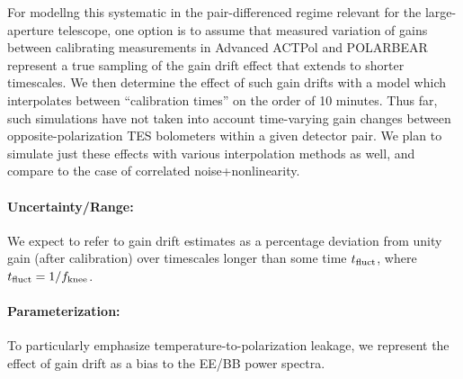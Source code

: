 For modellng this systematic in the pair-differenced regime relevant for the large-aperture telescope, one option is to assume that measured variation of gains between calibrating measurements in Advanced ACTPol and POLARBEAR represent a true sampling of the gain drift effect that extends to shorter timescales. We then determine the effect of such gain drifts with a model which interpolates between ``calibration times'' on the order of 10 minutes. Thus far, such simulations have not taken into account time-varying gain changes between opposite-polarization TES bolometers within a given detector pair. We plan to simulate just these effects with various interpolation methods as well, and compare to the case of correlated noise+nonlinearity.%

\paragraph{Uncertainty/Range:}
We expect to refer to gain drift estimates as a percentage deviation from unity gain (after calibration) over timescales longer than some time $t_{\mbox{\scriptsize fluct}}$, where $t_{\mbox{\scriptsize fluct}} = 1 / f_{\mbox{\scriptsize knee}}$.

\paragraph{Parameterization:}
To particularly emphasize temperature-to-polarization leakage, we represent the effect of gain drift as a bias to the EE/BB power spectra.